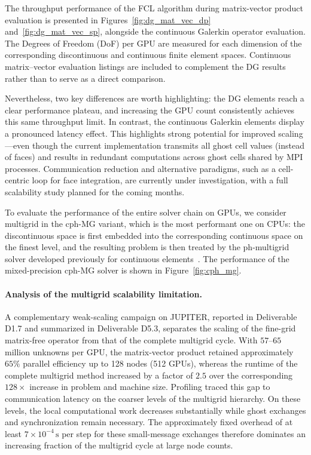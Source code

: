 \documentclass[a4paper,12pt]{article}
\begin{document}
The throughput performance of the FCL algorithm during matrix-vector product evaluation is presented in Figures~\ref{fig:dg_mat_vec_dp} and~\ref{fig:dg_mat_vec_sp}, alongside the continuous Galerkin operator evaluation. The Degrees of Freedom (DoF) per GPU are measured for each dimension of the corresponding discontinuous and continuous finite element spaces. Continuous matrix–vector evaluation listings are included to complement the DG results rather than to serve as a direct comparison.

Nevertheless, two key differences are worth highlighting: the DG elements reach a clear performance plateau, and increasing the GPU count consistently achieves this same throughput limit. In contrast, the continuous Galerkin elements display a pronounced latency effect. This highlights strong potential for improved scaling—even though the current implementation transmits all ghost cell values (instead of faces) and results in redundant computations across ghost cells shared by MPI processes. Communication reduction and alternative paradigms, such as a cell-centric loop for face integration, are currently under investigation, with a full scalability study planned for the coming months.



To evaluate the performance of the entire solver chain on GPUs, we consider multigrid in the cph-MG variant, which is the most performant one on CPUs: the discontinuous space is first embedded into the corresponding continuous space on the finest level, and the resulting problem is then treated by the ph-multigrid solver developed previously for continuous elements~\citep{Fehn2020}. The performance of the mixed-precision cph-MG solver is shown in Figure~\ref{fig:cph_mg}.


\paragraph{Analysis of the multigrid scalability limitation.}
A complementary weak-scaling campaign on JUPITER, reported in Deliverable
D1.7 and summarized in Deliverable D5.3, separates the scaling of the
fine-grid matrix-free operator from that of the complete multigrid cycle.
With $57$--$65$ million unknowns per GPU, the matrix-vector product retained
approximately $65\%$ parallel efficiency up to 128 nodes (512 GPUs), whereas
the runtime of the complete multigrid method increased by a factor of $2.5$
over the corresponding $128\times$ increase in problem and machine size.
Profiling traced this gap to communication latency on the coarser levels of
the multigrid hierarchy. On these levels, the local computational work
decreases substantially while ghost exchanges and synchronization remain
necessary. The approximately fixed overhead of at least
$7\times10^{-4}\,\mathrm{s}$ per step for these small-message exchanges
therefore dominates an increasing fraction of the multigrid cycle at large
node counts.
\end{document}
